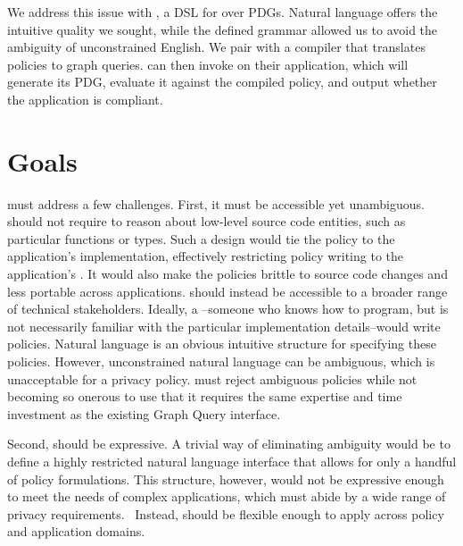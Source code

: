 We address this issue with \syslang{}, a DSL for \policies{} over PDGs.
%
Natural language offers the intuitive quality we sought, while the defined grammar allowed us to avoid the ambiguity of unconstrained English.
%
We pair \syslang{} with a compiler that translates policies to \sys{} graph queries.
%
\Devs{} can then invoke \sys{} on their application,
which will generate its PDG, evaluate it against the compiled \syslang{} policy,
and output whether the application is compliant.
%

\section{Goals}
\syslang{} must address a few challenges.
%
First, it must be accessible yet unambiguous.
%
\syslang{} should not require \writers{} to reason about low-level source code entities, such as particular functions or types.
%
Such a design would tie the policy to the application's implementation, effectively restricting policy writing to the application's \devs.
%
It would also make the policies brittle to source code changes and less portable across applications.
%
\syslang{} should instead be accessible to a broader range of technical stakeholders.
%
Ideally, a \ce--someone who knows how to program, but is not necessarily familiar with the particular implementation details--would write policies.
%
Natural language is an obvious intuitive structure for specifying these policies.
%
However, unconstrained natural language can be ambiguous, which is unacceptable for a privacy policy.
%
\syslang{} must reject ambiguous policies while not becoming so onerous to use that it 
requires the same expertise and time investment as the existing Graph Query interface.

Second, \syslang{} should be expressive.
%
A trivial way of eliminating ambiguity would be to define a highly restricted natural language interface that allows for only a handful of policy formulations.
%
This structure, however, would not be expressive enough to meet the needs of complex applications, 
which must abide by a wide range of privacy requirements.~\cite{todo}
%
Instead, \syslang{} should be flexible enough to apply across policy and application domains.

